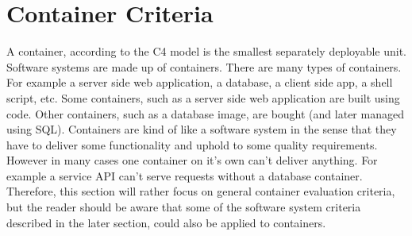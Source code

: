 \documentclass[12pt]{article}
\begin{document}
\section{Container Criteria}
A container, according to the C4 model is the smallest separately deployable unit. Software systems are made up of containers. There are many types of containers. For example a server side web application, a database, a client side app, a shell script, etc. Some containers, such as a server side web application are built using code. Other containers, such as a database image, are bought (and later managed using SQL). Containers are kind of like a software system in the sense that they have to deliver some functionality and uphold to some quality requirements. However in many cases one container on it's own can't deliver anything. For example a service API can't serve requests without a database container. Therefore, this section will rather focus on general container evaluation criteria, but the reader should be aware that some of the software system criteria described in the later section, could also be applied to containers.
\end{document}

